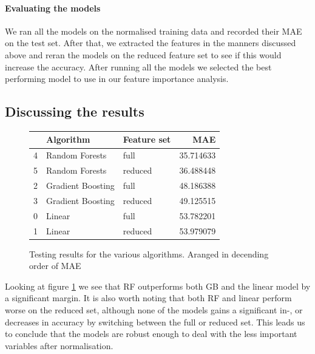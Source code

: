 \documentclass[british]{article}
\begin{document}
	\paragraph{Evaluating the models} We ran all the models on the normalised training data and recorded their MAE on the test set. After that, we extracted the features in the manners discussed above and reran the models on the reduced feature set to see if this would increase the accuracy. After running all the models we selected the best performing model to use in our feature importance analysis. 
	
	\subsection{Discussing the results}
	\label{discussion}
	
	\begin{figure}[!ht]
		\begin{tabular}{|l|l|l|r|}
			\toprule
			{} &          Algorithm & Feature set &        MAE \\
			\midrule
			4 &     Random Forests &        full &  35.714633 \\
			5 &     Random Forests &     reduced &  36.488448 \\
			2 &  Gradient Boosting &        full &  48.186388 \\
			3 &  Gradient Boosting &     reduced &  49.125515 \\
			0 &             Linear &        full &  53.782201 \\
			1 &             Linear &     reduced &  53.979079 \\
			\bottomrule
		\end{tabular}
		\caption{Testing results for the various algorithms. Aranged in decending order of MAE}
		\label{resultsTable}
		
	\end{figure}
	Looking at figure \ref{resultsTable} we see that RF outperforms both GB and the linear model by a significant margin. It is also worth noting that both RF and linear perform worse on the reduced set, although none of the models gains a significant in-, or decreases in accuracy by switching between the full or reduced set. This leads us to conclude that the models are robust enough to deal with the less important variables after normalisation. 
	
\end{document}
